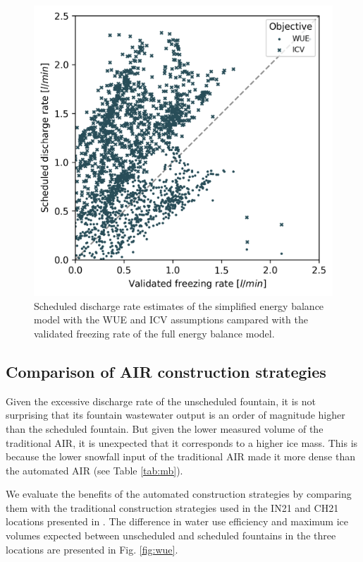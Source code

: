 \documentclass[tc, manuscript]{copernicus}
\begin{document}
\begin{figure}[t]
\includegraphics[width=12cm]{Figures/freezing_rate_corr.png}
\caption{Scheduled discharge rate estimates of the simplified energy balance model with the WUE and ICV
assumptions campared with the validated freezing rate of the full energy balance model.}
\label{fig:freezing_rate}
\end{figure}

\subsection{Comparison of AIR construction strategies}

Given the excessive discharge rate of the unscheduled fountain, it is not surprising that its fountain
wastewater output is an order of magnitude higher than the scheduled fountain. But given the lower measured
volume of the traditional AIR, it is unexpected that it corresponds to a higher ice mass. This is because the
lower snowfall input of the traditional AIR made it more dense than the automated AIR (see Table \ref{tab:mb}). 

We evaluate the benefits of the automated construction strategies by comparing them with the traditional
construction strategies used in the IN21 and CH21 locations presented in
\cite{balasubramanianInfluenceMeteorologicalConditions2022}. The difference in water use efficiency and maximum
ice volumes expected between unscheduled and scheduled fountains in the three locations are presented in Fig.
\ref{fig:wue}.
\end{document}
